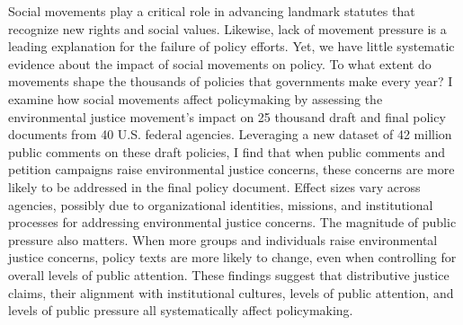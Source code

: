 Social movements play a critical role in advancing landmark statutes that recognize new rights and social values. Likewise, lack of movement pressure is a leading explanation for the failure of policy efforts. Yet, we have little systematic evidence about the impact of social movements on policy. To what extent do movements shape the thousands of policies that governments make every year? I examine how social movements affect policymaking by assessing the environmental justice movement's impact on 25 thousand draft and final policy documents from 40 U.S. federal agencies. Leveraging a new dataset of 42 million public comments on these draft policies, I find that when public comments and petition campaigns raise environmental justice concerns, these concerns are more likely to be addressed in the final policy document. Effect sizes vary across agencies, possibly due to organizational identities, missions, and institutional processes for addressing environmental justice concerns. The magnitude of public pressure also matters. When more groups and individuals raise environmental justice concerns, policy texts are more likely to change, even when controlling for overall levels of public attention. These findings suggest that distributive justice claims, their alignment with institutional cultures, levels of public attention, and levels of public pressure all systematically affect policymaking.